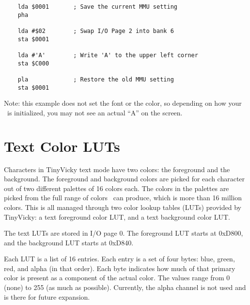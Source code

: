 \begin{verbatim}
    lda $0001       ; Save the current MMU setting
    pha

    lda #$02        ; Swap I/O Page 2 into bank 6
    sta $0001

    lda #'A'        ; Write 'A' to the upper left corner
    sta $C000

    pla             ; Restore the old MMU setting
    sta $0001
\end{verbatim}

Note: this example does not set the font or the color, so depending on how your \jr\ is initialized, you may not see an actual ``A'' on the screen.

\section*{Text Color LUTs}

Characters in TinyVicky text mode have two colors: the foreground and the background. The foreground and background colors are picked for each character out of two different palettes of 16 colors each. The colors in the palettes are picked from the full range of colors \jr\ can produce, which is more than 16 million colors. This is all managed through two color lookup tables (LUTs) provided by TinyVicky: a text foreground color LUT, and a text background color LUT.

The text LUTs are stored in I/O page 0. The foreground LUT starts at 0xD800, and the background LUT starts at 0xD840.

Each LUT is a list of 16 entries. Each entry is a set of four bytes: blue, green, red, and alpha (in that order). Each byte indicates how much of that primary color is present as a component of the actual color. The values range from 0 (none) to 255 (as much as possible). Currently, the alpha channel is not used and is there for future expansion.

